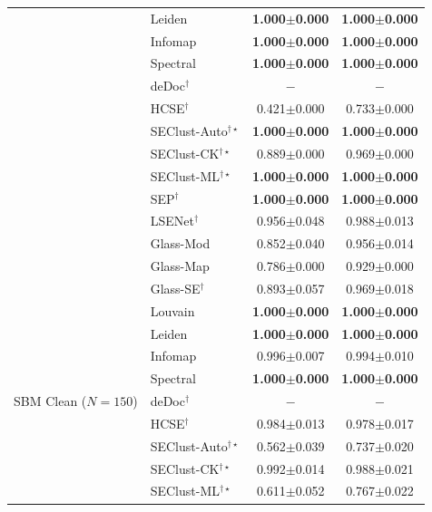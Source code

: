 {\begin{longtable}{@{}llcc@{}}
  & Leiden                      & \textbf{1.000$\pm$0.000} & \textbf{1.000$\pm$0.000} \\
  & Infomap                     & \textbf{1.000$\pm$0.000} & \textbf{1.000$\pm$0.000} \\
  & Spectral                    & \textbf{1.000$\pm$0.000} & \textbf{1.000$\pm$0.000} \\
  & deDoc$^\dagger$              & $-$ & $-$ \\
  & HCSE$^\dagger$              & 0.421$\pm$0.000 & 0.733$\pm$0.000 \\
  & SEClust-Auto$^{\dagger\star}$ & \textbf{1.000$\pm$0.000} & \textbf{1.000$\pm$0.000} \\
  & SEClust-CK$^{\dagger\star}$  & 0.889$\pm$0.000 & 0.969$\pm$0.000 \\
  & SEClust-ML$^{\dagger\star}$  & \textbf{1.000$\pm$0.000} & \textbf{1.000$\pm$0.000} \\
  & SEP$^\dagger$               & \textbf{1.000$\pm$0.000} & \textbf{1.000$\pm$0.000} \\
  & LSENet$^\dagger$            & 0.956$\pm$0.048 & 0.988$\pm$0.013 \\
  & Glass-Mod                   & 0.852$\pm$0.040 & 0.956$\pm$0.014 \\
  & Glass-Map                   & 0.786$\pm$0.000 & 0.929$\pm$0.000 \\
  & Glass-SE$^\dagger$          & 0.893$\pm$0.057 & 0.969$\pm$0.018 \\
\midrule
\multirow{14}{*}{SBM Clean ($N{=}150$)}
  & Louvain                     & \textbf{1.000$\pm$0.000} & \textbf{1.000$\pm$0.000} \\
  & Leiden                      & \textbf{1.000$\pm$0.000} & \textbf{1.000$\pm$0.000} \\
  & Infomap                     & 0.996$\pm$0.007 & 0.994$\pm$0.010 \\
  & Spectral                    & \textbf{1.000$\pm$0.000} & \textbf{1.000$\pm$0.000} \\
  & deDoc$^\dagger$              & $-$ & $-$ \\
  & HCSE$^\dagger$              & 0.984$\pm$0.013 & 0.978$\pm$0.017 \\
  & SEClust-Auto$^{\dagger\star}$ & 0.562$\pm$0.039 & 0.737$\pm$0.020 \\
  & SEClust-CK$^{\dagger\star}$  & 0.992$\pm$0.014 & 0.988$\pm$0.021 \\
  & SEClust-ML$^{\dagger\star}$  & 0.611$\pm$0.052 & 0.767$\pm$0.022 \\

\end{longtable}}
